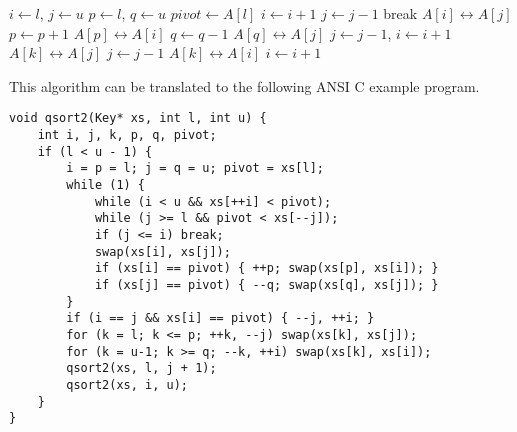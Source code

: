 \documentclass{article}
\begin{document}
\begin{algorithmic}
    \State $i \gets l$, $j \gets u$
    \State $p \gets l$, $q \gets u$ 
    \State $pivot \gets A[l]$
    \Loop
      \Repeat
        \State $i \gets i + 1$
       
      \Repeat
        \State $j \gets j - 1$
       
        \State break 
      \EndIf
      \State {} $A[i] \leftrightarrow A[j]$
       
        \State $p \gets p + 1$
        \State {} $A[p] \leftrightarrow A[i]$
      \EndIf
        \State $q \gets q - 1$
        \State {} $A[q] \leftrightarrow A[j]$
      \EndIf
    \EndLoop
     
      \State $j \gets j - 1$, $i \gets i + 1$
    \EndIf
     
      \State {} $A[k] \leftrightarrow A[j]$
      \State $j \gets j - 1$
    \EndFor
      \State {} $A[k] \leftrightarrow A[i]$
      \State $i \gets i + 1$
    \EndFor
    \State {}
    \State {}
  \EndIf
\EndProcedure
\end{algorithmic}

This algorithm can be translated to the following ANSI C example program.

\lstset{language=C}
\begin{lstlisting}
void qsort2(Key* xs, int l, int u) {
    int i, j, k, p, q, pivot;
    if (l < u - 1) {
        i = p = l; j = q = u; pivot = xs[l];
        while (1) {
            while (i < u && xs[++i] < pivot);
            while (j >= l && pivot < xs[--j]);
            if (j <= i) break;
            swap(xs[i], xs[j]);
            if (xs[i] == pivot) { ++p; swap(xs[p], xs[i]); }
            if (xs[j] == pivot) { --q; swap(xs[q], xs[j]); }
        }
        if (i == j && xs[i] == pivot) { --j, ++i; }
        for (k = l; k <= p; ++k, --j) swap(xs[k], xs[j]);
        for (k = u-1; k >= q; --k, ++i) swap(xs[k], xs[i]);
        qsort2(xs, l, j + 1);
        qsort2(xs, i, u);
    }
}
\end{lstlisting}
\end{document}
